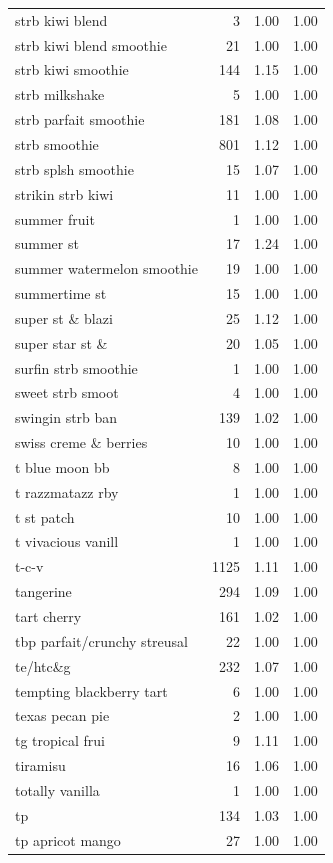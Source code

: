 \begin{table}
\begin{tabular}{lrrr}
strb kiwi blend & 3 & 1.00 & 1.00 \\
strb kiwi blend smoothie & 21 & 1.00 & 1.00 \\
strb kiwi smoothie & 144 & 1.15 & 1.00 \\
strb milkshake & 5 & 1.00 & 1.00 \\
strb parfait smoothie & 181 & 1.08 & 1.00 \\
strb smoothie & 801 & 1.12 & 1.00 \\
strb splsh smoothie & 15 & 1.07 & 1.00 \\
strikin strb kiwi & 11 & 1.00 & 1.00 \\
summer fruit & 1 & 1.00 & 1.00 \\
summer st & 17 & 1.24 & 1.00 \\
summer watermelon smoothie & 19 & 1.00 & 1.00 \\
summertime st & 15 & 1.00 & 1.00 \\
super st \& blazi & 25 & 1.12 & 1.00 \\
super star st \& & 20 & 1.05 & 1.00 \\
surfin strb smoothie & 1 & 1.00 & 1.00 \\
sweet strb smoot & 4 & 1.00 & 1.00 \\
swingin strb ban & 139 & 1.02 & 1.00 \\
swiss creme \& berries & 10 & 1.00 & 1.00 \\
t blue moon bb & 8 & 1.00 & 1.00 \\
t razzmatazz rby & 1 & 1.00 & 1.00 \\
t st patch & 10 & 1.00 & 1.00 \\
t vivacious vanill & 1 & 1.00 & 1.00 \\
t-c-v & 1125 & 1.11 & 1.00 \\
tangerine & 294 & 1.09 & 1.00 \\
tart cherry & 161 & 1.02 & 1.00 \\
tbp parfait/crunchy streusal & 22 & 1.00 & 1.00 \\
te/htc\&g & 232 & 1.07 & 1.00 \\
tempting blackberry tart & 6 & 1.00 & 1.00 \\
texas pecan pie & 2 & 1.00 & 1.00 \\
tg tropical frui & 9 & 1.11 & 1.00 \\
tiramisu & 16 & 1.06 & 1.00 \\
totally vanilla & 1 & 1.00 & 1.00 \\
tp & 134 & 1.03 & 1.00 \\
tp apricot mango & 27 & 1.00 & 1.00 \\

\end{tabular}
\end{table}
